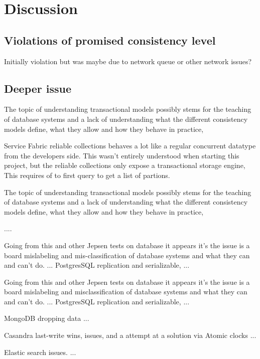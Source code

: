 \documentclass[a4paper,10pt,titlepage]{report}
\begin{document}
\newpage

\section{Discussion}
\subsection{Violations of promised consistency level}

Initially violation but was maybe due to network queue or other network issues?


\subsection{Deeper issue}
The topic of understanding transactional models possibly stems for the teaching of database systems and a lack of understanding what the different consistency models define, what they allow and how they behave in practice,


Service Fabric reliable collections behaves a lot like a regular concurrent datatype from the developers side. This wasn't entirely understood when starting this project, but the reliable collections only expose a transactional storage engine, This requires of to first query to get a list of partions.
    
    

The topic of understanding transactional models possibly stems for the teaching of database systems and a lack of understanding what the different consistency models define, what they allow and how they behave in practice,

....

Going from this and other Jepsen tests on database it appears it's the issue is a board mislabeling and mis-classification of database systems and what they can and can't do.
...
PostgresSQL replication and serializable,
...

Going from this and other Jepsen tests on database it appears it's the issue is a board mislabeling and misclassification of database systems and what they can and can't do.
...
PostgresSQL replication and serializable,
...

MongoDB dropping data
...

Casandra last-write wins, issues, and a attempt at a solution via Atomic clocks
...

Elastic search issues.
...
\end{document}
